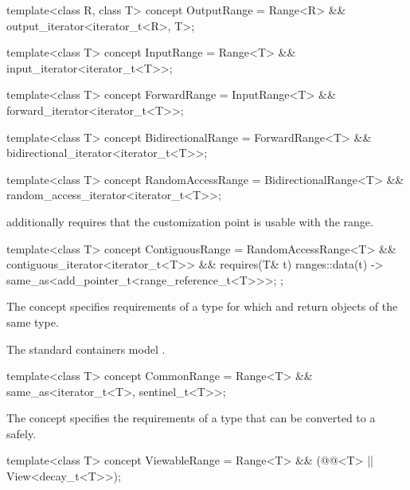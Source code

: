 %
%
%
%
%
\begin{itemdecl}
template<class R, class T>
  concept OutputRange =
    Range<R> && output_iterator<iterator_t<R>, T>;

template<class T>
  concept InputRange =
    Range<T> && input_iterator<iterator_t<T>>;

template<class T>
  concept ForwardRange =
    InputRange<T> && forward_iterator<iterator_t<T>>;

template<class T>
  concept BidirectionalRange =
    ForwardRange<T> && bidirectional_iterator<iterator_t<T>>;

template<class T>
  concept RandomAccessRange =
    BidirectionalRange<T> && random_access_iterator<iterator_t<T>>;
\end{itemdecl}

\pnum
{} additionally requires that
the  customization point
is usable with the range.

%
\begin{itemdecl}
template<class T>
  concept ContiguousRange =
    RandomAccessRange<T> && contiguous_iterator<iterator_t<T>> &&
    requires(T& t) {
      { ranges::data(t) } -> same_as<add_pointer_t<range_reference_t<T>>>;
    };
\end{itemdecl}

\pnum
The  concept specifies requirements of
a  type for which  and
 return objects of the same type.
\begin{example}
The standard containers model .
\end{example}

%
\begin{itemdecl}
template<class T>
  concept CommonRange =
    Range<T> && same_as<iterator_t<T>, sentinel_t<T>>;
\end{itemdecl}

\pnum
The  concept specifies the requirements of a
 type that can be converted to a  safely.

%
\begin{itemdecl}
template<class T>
  concept ViewableRange =
    Range<T> && (@@<T> || View<decay_t<T>>);
\end{itemdecl}

